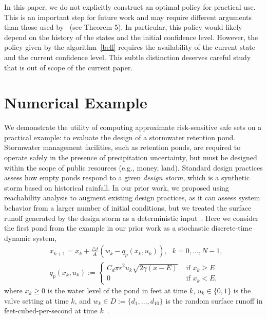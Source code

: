 \documentclass[letterpaper, 10 pt, conference]{ieeeconf}  %
\begin{document}
In this paper, we do not explicitly construct an optimal policy for practical use.
This is an important step for future work and may require different arguments 
than those used by~\cite{chow2015risk} (see Theorem 5). In particular, this policy would likely depend 
on the history of the states and the initial confidence level. However, the policy given by the algorithm~\eqref{bell}
requires the availability of the current state and the current confidence level. 
This subtle distinction deserves careful study that is out of scope of the current paper.

\section{Numerical Example}\label{ex}
We demonstrate the utility of computing approximate risk-sensitive safe sets on a practical example:
to evaluate the design of a stormwater retention pond. 
Stormwater management facilities, such as retention ponds, are required to operate safely 
in the presence of precipitation uncertainty, but must be designed within the scope of public resources (e.g., money, land). 
Standard design practices assess how empty ponds respond to a given \textit{design storm},
which is a synthetic storm based on historical rainfall.  
In our prior work, we proposed using reachability analysis to augment existing design practices, as it can assess 
system behavior from a larger number of initial conditions, but we treated the surface runoff generated by the design storm as a deterministic input~\cite{sustech}.
Here we consider the first pond from the example in our prior work as a stochastic discrete-time dynamic system,
\begin{equation}\begin{aligned}
& x_{k+1} = x_k + \frac{\triangle t}{A} (w_k - q_p(x_k, u_k)), \text{ }k = 0, \dots, N-1, \\
& q_p(x_k,u_k) := \begin{cases} C_d \pi r^2 u_k \sqrt{ 2\gamma(x-E) } & \text{ if } x_k \geq E \\
						0 & \text{ if } x_k < E, \end{cases}
\end{aligned}\label{watersys}\end{equation}
where $x_k \geq 0$ is the water level of the pond in feet at time $k$, $u_k \in \{0, 1\}$ is the valve setting at time $k$,
and $w_k \in D := \{d_1, \dots, d_{10}\}$ is the random surface runoff in feet-cubed-per-second at time $k$~\cite{sustech}.\footnotemark
\end{document}
